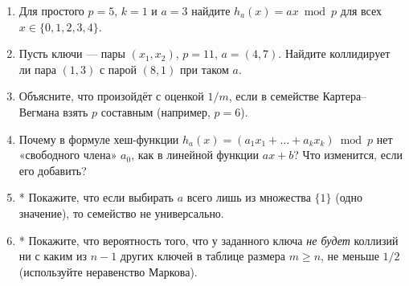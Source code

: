 \begin{tasksbox}
\begin{enumerate}
  \item Для простого $p = 5$, $k = 1$ и $a = 3$ найдите $h_a(x) = a x \bmod p$ для всех $x \in \{0, 1, 2, 3, 4\}$.
  \item Пусть ключи --- пары $(x_1, x_2)$, $p = 11$, $a = (4, 7)$. Найдите коллидирует ли пара $(1, 3)$ с парой $(8, 1)$ при таком $a$.
  \item Объясните, что произойдёт с оценкой $1/m$, если в семействе Картера--Вегмана взять $p$ составным (например, $p = 6$).
  \item Почему в формуле хеш-функции $h_a(x) = (a_1 x_1 + \dots + a_k x_k) \bmod p$ нет «свободного члена» $a_0$, как в линейной функции $a x + b$? Что изменится, если его добавить?
  \item* Покажите, что если выбирать $a$ всего лишь из множества $\{1\}$ (одно значение), то семейство не универсально.
  \item* Покажите, что вероятность того, что у заданного ключа \emph{не будет} коллизий ни с каким из $n-1$ других ключей в таблице размера $m \ge n$, не меньше $1/2$ (используйте неравенство Маркова).
\end{enumerate}
\end{tasksbox}
